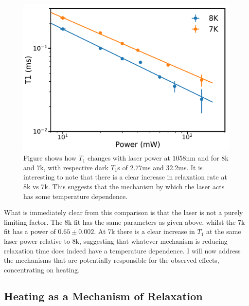 \begin{figure}
\centering
\includegraphics[width=0.8\columnwidth]{Figures/T17Kvs8k_1058nmTest.pdf}
\caption[$T_1$ temperature comparison]{Figure shows how $T_1$ changes with laser power at 1058nm and for 8k and 7k, with respective dark $T_1$s of 2.77ms and 32.2ms. It is interesting to note that there is a clear increase in relaxation rate at 8k vs 7k. This suggests that the mechanism by which the laser acts has some temperature dependence.}
\label{fig:t1tempcomp}
\end{figure}

What is immediately clear from this comparison is that the laser is not a purely limiting factor.
The 8k fit has the same parameters as given above, whilst the 7k fit has a power of $0.65\pm 0.002$.
At 7k there is a clear increase in $T_1$ at the same laser power relative to 8k, suggesting that whatever mechanism is reducing relaxation time does indeed have a temperature dependence.
I will now address the mechanisms that are potentially responsible for the observed effects, concentrating on heating.

\subsection{Heating as a Mechanism of Relaxation}

